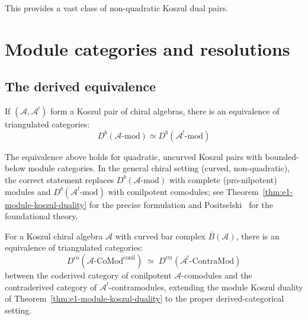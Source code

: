 This provides a vast class of non-quadratic Koszul dual pairs.


\section{Module categories and resolutions}

\subsection{The derived equivalence}

\begin{theorem}
\label{thm:koszul-equivalence-categories}
If $(\mathcal{A}, \mathcal{A}^!)$ form a Koszul pair of chiral algebras, there is an equivalence of triangulated categories:
\[
D^b(\mathcal{A}\text{-mod}) \simeq D^b(\mathcal{A}^!\text{-mod})
\]
\end{theorem}

\begin{remark}\label{rem:module-equiv-caveat}
The equivalence above holds for quadratic, uncurved Koszul pairs with bounded-below module categories.  In the general chiral setting (curved, non-quadratic), the correct statement replaces $D^b(\mathcal{A}\text{-mod})$ with complete (pro-nilpotent) modules and $D^b(\mathcal{A}^!\text{-mod})$ with conilpotent comodules; see Theorem~\ref{thm:e1-module-koszul-duality} for the precise formulation and Positselski~\cite{Positselski11} for the foundational theory.
\end{remark}

\begin{theorem}
\label{thm:positselski-chiral}
For a Koszul chiral algebra $\mathcal{A}$ with curved bar complex $\bar{B}(\mathcal{A})$, there is an equivalence of triangulated categories:
\begin{equation}\label{eq:positselski-equivalence}
D^{\mathrm{co}}(\mathcal{A}\text{-}\mathrm{CoMod}^{\mathrm{conil}}) \;\simeq\; D^{\mathrm{ctr}}(\mathcal{A}^!\text{-}\mathrm{ContraMod})
\end{equation}
between the coderived category of conilpotent $\mathcal{A}$-comodules and the contraderived category of $\mathcal{A}^!$-contramodules, extending the module Koszul duality of Theorem~\textup{\ref{thm:e1-module-koszul-duality}} to the proper derived-categorical setting.
\end{theorem}

